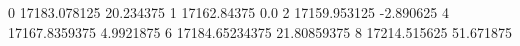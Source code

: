 0 17183.078125 20.234375
1 17162.84375 0.0
2 17159.953125 -2.890625
4 17167.8359375 4.9921875
6 17184.65234375 21.80859375
8 17214.515625 51.671875
